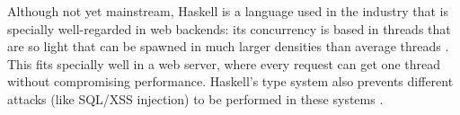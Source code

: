 Although not yet mainstream, Haskell is a language used in the industry that is
specially well-regarded in web backends: its concurrency is based in threads
that are so light that can be spawned in much larger densities than average
threads \cite{epstein-2011-cloud}. This fits specially well in a web server,
where every request can get one thread without compromising performance.
Haskell's type system also prevents different attacks (like SQL/XSS injection)
to be performed in these systems \cite{snoyman-2015-yesod}.

\newpage

